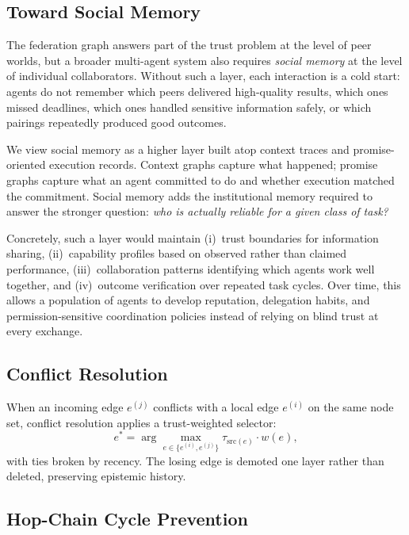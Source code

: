 \documentclass[11pt]{article}
\begin{document}
\subsection{Toward Social Memory}

The federation graph answers part of the trust problem at the level of peer
worlds, but a broader multi-agent system also requires \emph{social memory} at
the level of individual collaborators. Without such a layer, each interaction is
a cold start: agents do not remember which peers delivered high-quality results,
which ones missed deadlines, which ones handled sensitive information safely, or
which pairings repeatedly produced good outcomes.

We view social memory as a higher layer built atop context traces and
promise-oriented execution records. Context graphs capture what happened; promise
graphs capture what an agent committed to do and whether execution matched the
commitment. Social memory adds the institutional memory required to answer the
stronger question: \emph{who is actually reliable for a given class of task?}

Concretely, such a layer would maintain (i)~trust boundaries for information
sharing, (ii)~capability profiles based on observed rather than claimed
performance, (iii)~collaboration patterns identifying which agents work well
together, and (iv)~outcome verification over repeated task cycles. Over time,
this allows a population of agents to develop reputation, delegation habits, and
permission-sensitive coordination policies instead of relying on blind trust at
every exchange.

\subsection{Conflict Resolution}

When an incoming edge $e^{(j)}$ conflicts with a local edge $e^{(i)}$ on the
same node set, conflict resolution applies a trust-weighted selector:
\begin{equation}
  e^* = \arg\max_{e \in \{e^{(i)}, e^{(j)}\}} \tau_{\text{src}(e)} \cdot w(e),
  \label{eq:conflict}
\end{equation}
with ties broken by recency. The losing edge is demoted one layer rather than
deleted, preserving epistemic history.

\subsection{Hop-Chain Cycle Prevention}
\end{document}
